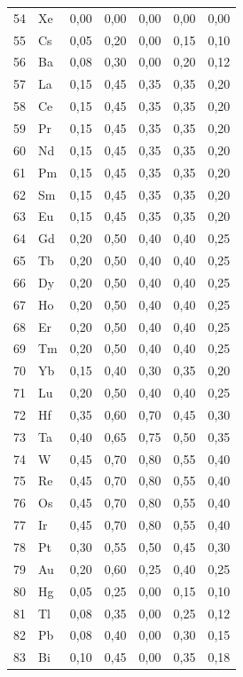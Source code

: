 \documentclass[12pt,a4paper]{article}
\begin{document}
\begin{longtable}{p{2.2cm}p{1.2cm}p{2.2cm}p{2.2cm}p{2.2cm}p{2.2cm}p{2.2cm}}
		54 & Xe  & 0,00 & 0,00 & 0,00 & 0,00 & 0,00 \\
		55 & Cs  & 0,05 & 0,20 & 0,00 & 0,15 & 0,10 \\
		56 & Ba  & 0,08 & 0,30 & 0,00 & 0,20 & 0,12 \\
		57 & La  & 0,15 & 0,45 & 0,35 & 0,35 & 0,20 \\
		58 & Ce  & 0,15 & 0,45 & 0,35 & 0,35 & 0,20 \\
		59 & Pr  & 0,15 & 0,45 & 0,35 & 0,35 & 0,20 \\
		60 & Nd  & 0,15 & 0,45 & 0,35 & 0,35 & 0,20 \\
		61 & Pm  & 0,15 & 0,45 & 0,35 & 0,35 & 0,20 \\
		62 & Sm  & 0,15 & 0,45 & 0,35 & 0,35 & 0,20 \\
		63 & Eu  & 0,15 & 0,45 & 0,35 & 0,35 & 0,20 \\
		64 & Gd  & 0,20 & 0,50 & 0,40 & 0,40 & 0,25 \\
		65 & Tb  & 0,20 & 0,50 & 0,40 & 0,40 & 0,25 \\
		66 & Dy  & 0,20 & 0,50 & 0,40 & 0,40 & 0,25 \\
		67 & Ho  & 0,20 & 0,50 & 0,40 & 0,40 & 0,25 \\
		68 & Er  & 0,20 & 0,50 & 0,40 & 0,40 & 0,25 \\
		69 & Tm  & 0,20 & 0,50 & 0,40 & 0,40 & 0,25 \\
		70 & Yb  & 0,15 & 0,40 & 0,30 & 0,35 & 0,20 \\
		71 & Lu  & 0,20 & 0,50 & 0,40 & 0,40 & 0,25 \\
		72 & Hf  & 0,35 & 0,60 & 0,70 & 0,45 & 0,30 \\
		73 & Ta  & 0,40 & 0,65 & 0,75 & 0,50 & 0,35 \\
		74 & W   & 0,45 & 0,70 & 0,80 & 0,55 & 0,40 \\
		75 & Re  & 0,45 & 0,70 & 0,80 & 0,55 & 0,40 \\
		76 & Os  & 0,45 & 0,70 & 0,80 & 0,55 & 0,40 \\
		77 & Ir  & 0,45 & 0,70 & 0,80 & 0,55 & 0,40 \\
		78 & Pt  & 0,30 & 0,55 & 0,50 & 0,45 & 0,30 \\
		79 & Au  & 0,20 & 0,60 & 0,25 & 0,40 & 0,25 \\
		80 & Hg  & 0,05 & 0,25 & 0,00 & 0,15 & 0,10 \\
		81 & Tl  & 0,08 & 0,35 & 0,00 & 0,25 & 0,12 \\
		82 & Pb  & 0,08 & 0,40 & 0,00 & 0,30 & 0,15 \\
		83 & Bi  & 0,10 & 0,45 & 0,00 & 0,35 & 0,18 \\

\end{longtable}
\end{document}
